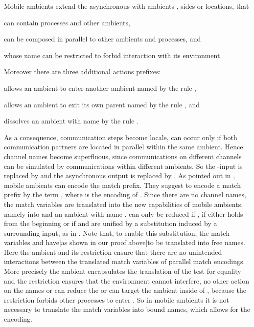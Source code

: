 \documentclass[final,copyright,creativecommons]{eptcs}
\begin{document}
Mobile ambients \cite{cardelliGordon00} extend the asynchronous \piCal with ambients , \ie sides or locations, that
\begin{inparaenum}[(a)]
	\item can contain processes and other ambients,
	\item can be composed in parallel to other ambients and processes, and
	\item whose name can be restricted to forbid interaction with its environment.
\end{inparaenum}
Moreover there are three additional actions prefixes:
\begin{inparaenum}[(1)]
	\item  allows an ambient to enter another ambient named  by the rule ,
	\item  allows an ambient to exit its own parent named  by the rule , and
	\item  dissolves an ambient with name  by the rule .
\end{inparaenum}
As a consequence, communication steps become locale, \ie can occur only if both communication partners are located in parallel within the same ambient. Hence channel names become superfluous, since communications on different channels can be simulated by communications within different ambients. So the -input  is replaced by  and the asynchronous output  is replaced by .
As pointed out in \cite{vig}, mobile ambients can encode the match prefix. They suggest to encode a match prefix  by the term , where  is the encoding of .
Since there are no channel names, the match variables are translated into the new capabilities of mobile ambients, namely into  and an ambient with name .  can only be reduced if , \ie if either  holds from the beginning or if  and  are unified by a substitution induced by a surrounding input, as \eg in . Note that, to enable this substitution, the match variables  and  {have}|{as} shown in our proof {above}|{to} be translated into free names. Here the ambient  and its restriction ensure that there are no unintended interactions between the translated match variables of parallel match encodings. More precisely the ambient  encapsulates the translation of the test for equality  and the restriction  ensures that the environment cannot interfere, \ie no other action on the names  or  can reduce the  or can target the ambient  inside of , because the restriction forbids other processes to enter . So in mobile ambients it is not necessary to translate the match variables into bound names, which allows for the encoding.
\end{document}
